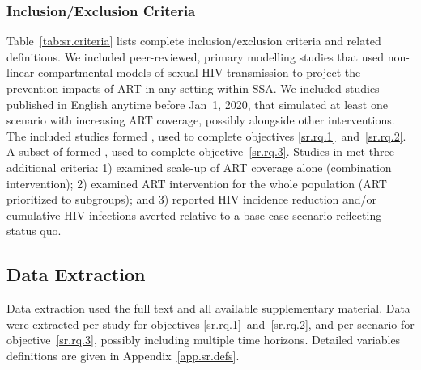 \subsubsection{Inclusion/Exclusion Criteria}\label{sr.meth.search.inex}
Table~\ref{tab:sr.criteria} lists complete inclusion/exclusion criteria and related definitions.
We included peer-reviewed, primary modelling studies that used
non-linear compartmental models of sexual HIV transmission
to project the prevention impacts of ART in any setting within SSA.
We included studies published in English anytime before Jan~1, 2020,
that simulated at least one scenario with increasing ART coverage,
possibly alongside other interventions.
The included studies formed , used to complete objectives \ref{sr.rq.1}~and~\ref{sr.rq.2}.
A subset of  formed , used to complete objective~\ref{sr.rq.3}.
Studies in  met three additional criteria:
1) examined scale-up of ART coverage alone (\vs combination intervention);
2) examined ART intervention for the whole population (\vs ART prioritized to subgroups); and
3) reported HIV incidence reduction and/or cumulative HIV infections averted
relative to a base-case scenario reflecting status quo.
\subsection{Data Extraction}\label{sr.meth.data}
Data extraction used the full text and all available supplementary material.
Data were extracted per-study for objectives \ref{sr.rq.1}~and~\ref{sr.rq.2}, and
per-scenario for objective~\ref{sr.rq.3}, possibly including multiple time horizons.
Detailed variables definitions are given in Appendix~\ref{app.sr.defs}.
